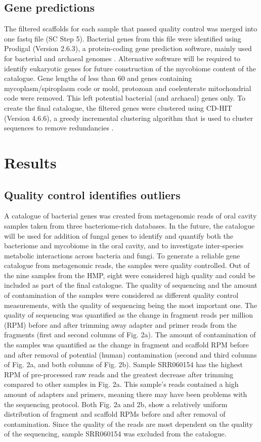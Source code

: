 \documentclass[a4paper]{article}
\begin{document}
\subsection{Gene predictions}
The filtered scaffolds for each sample that passed quality control was merged into one fastq file (SC Step 5). Bacterial genes from this file were identified using Prodigal (Version 2.6.3), a protein-coding gene prediction software, mainly used for bacterial and archaeal genomes \cite{hyatt_prodigal:_2010}. Alternative software will be required to identify eukaryotic genes for future construction of the mycobiome content of the catalogue. Gene lengths of less than 60 and genes containing mycoplasm/spiroplasm code or mold, protozoan and coelenterate mitochondrial code were removed. This left potential bacterial (and archaeal) genes only. To create the final catalogue, the filtered genes were clustered using CD-HIT (Version 4.6.6), a greedy incremental clustering algorithm that is used to cluster sequences to remove redundancies \cite{li_cd-hit:_2006}.

\section{Results}

\subsection{Quality control identifies outliers}

A catalogue of bacterial genes was created from metagenomic reads of oral cavity samples taken from three bacteriome-rich databases. In the future, the catalogue will be used for addition of fungal genes to identify and quantify both the bacteriome and mycobiome in the oral cavity, and to investigate inter-species metabolic interactions across bacteria and fungi. To generate a reliable gene catalogue from metagenomic reads, the samples were quality controlled. Out of the nine samples from the HMP, eight were considered high quality and could be included as part of the final catalogue. The quality of sequencing and the amount of contamination of the samples were considered as different quality control measurements, with the quality of sequencing being the most important one. The quality of sequencing was quantified as the change in fragment reads per million (RPM) before and after trimming away adapter and primer reads from the fragments (first and second columns of Fig. 2a). The amount of contamination of the samples was quantified as the change in fragment and scaffold RPM before and after removal of potential (human) contamination (second and third columns of Fig. 2a, and both columns of Fig. 2b). Sample SRR060154 has the highest RPM of pre-processed raw reads and the greatest decrease after trimming compared to other samples in Fig. 2a. This sample's reads contained a high amount of adapters and primers, meaning there may have been problems with the sequencing protocol. Both Fig. 2a and 2b, show a relatively uniform distribution of fragment and scaffold RPMs before and after removal of contamination. Since the quality of the reads are most dependent on the quality of the sequencing, sample SRR060154 was excluded from the catalogue.
\end{document}
